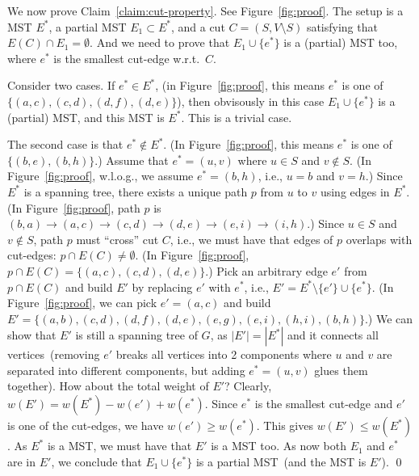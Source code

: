 We now prove Claim~\ref{claim:cut-property}.  See Figure~\ref{fig:proof}.
The setup is a MST $E^*$, a partial MST $E_1\subset E^*$,
and a cut $C = (S,V\setminus S)$ satisfying that $E(C)\cap E_1 = \emptyset$.
And we need to prove that $E_1\cup \{e^*\}$ is a (partial) MST too,
where $e^*$ is the smallest cut-edge w.r.t.\ $C$.

Consider two cases. If $e^* \in E^*$,
(in Figure~\ref{fig:proof}, this means $e^*$ is one of $\{(a,c),(c,d),(d,f),(d,e)\}$),
then obvisously in this case $E_1\cup \{e^*\}$ is a (partial) MST, and this MST is $E^*$.
This is a trivial case.

The second case is that $e^* \not\in E^*$.
(In Figure~\ref{fig:proof}, this means $e^*$ is one of $\{(b,e),(b,h)\}$.)
Assume that $e^* = (u,v)$ where $u\in S$ and $v\notin S$.
(In Figure~\ref{fig:proof}, w.l.o.g., we assume $e^* = (b,h)$, i.e., $u= b$ and $v=h$.)
Since $E^*$ is a spanning tree, there exists a unique path $p$ from $u$ to $v$ using edges in $E^*$.
(In Figure~\ref{fig:proof}, path $p$ is $(b,a)\to(a,c)\to(c,d)\to(d,e)\to(e,i)\to(i,h)$.)
Since $u\in S$ and $v\notin S$, path $p$ must ``cross'' cut $C$, i.e., 
we must have that edges of $p$ overlaps with cut-edges: $p\cap E(C)\neq \emptyset$.
(In Figure~\ref{fig:proof}, $p\cap E(C) = \{(a,c),(c,d),(d,e)\}$.)
Pick an arbitrary edge $e'$ from $p\cap E(C)$ and build
$E'$ by replacing $e'$ with $e^*$, i.e., $E' = E^* \setminus \{e'\} \cup \{e^*\}$.
(In Figure~\ref{fig:proof}, we can pick $e' = (a,c)$ and build $E' = \{(a,b),(c,d),(d,f),(d,e),(e,g),(e,i),(h,i),(b,h)\}$.)
We can show that $E'$ is still a spanning tree of $G$, as $|E'| = |E^*|$ and it connects all vertices~(removing $e'$ breaks
all vertices into 2 components where $u$ and $v$ are separated into different components, but adding $e^* = (u,v)$ glues them together).
How about the total weight of $E'$? Clearly, $w(E') = w(E^*) - w(e') + w(e^*)$.
Since $e^*$ is the smallest cut-edge and $e'$ is one of the cut-edges, we have $w(e') \ge w(e^*)$.
This gives $w(E') \le w(E^*)$. As $E^*$ is a MST, we must have that $E'$ is a MST too.
As now both $E_1$ and $e^*$ are in $E'$, we conclude that $E_1\cup \{e^*\}$ is a partial MST~(and the MST is $E'$). \qed

